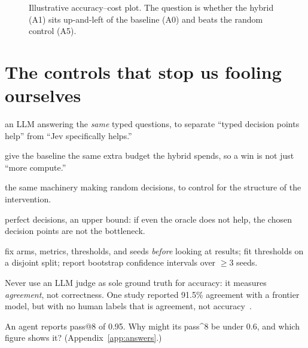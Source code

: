 \begin{figure}[h]\centering
{}
\caption{Illustrative accuracy--cost plot. The question is whether the hybrid (A1) sits
up-and-left of the baseline (A0) and beats the random control (A5).}
\label{fig:pareto}
\end{figure}

\section{The controls that stop us fooling ourselves}

\begin{description}[leftmargin=1.4cm,style=nextline]
  \item[Same-interface baseline (ARM-A2)] an LLM answering the \emph{same} typed questions,
    to separate ``typed decision points help'' from ``Jev specifically helps.''
  \item[Matched compute (ARM-A6)] give the baseline the same extra budget the hybrid spends,
    so a win is not just ``more compute.''
  \item[Random policy (ARM-A5)] the same machinery making random decisions, to control for
    the structure of the intervention.
  \item[Oracle (ARM-A4)] perfect decisions, an upper bound: if even the oracle does not help,
    the chosen decision points are not the bottleneck.
  \item[Pre-registration] fix arms, metrics, thresholds, and seeds \emph{before} looking at
    results; fit thresholds on a disjoint split; report bootstrap confidence intervals over
    $\ge 3$ seeds.
\end{description}

\begin{pitfall}
Never use an LLM judge as sole ground truth for accuracy: it measures \emph{agreement}, not
correctness. One study reported 91.5\% agreement with a frontier model, but with no human
labels that is agreement, not accuracy~\citep{good_start_labs}.
\end{pitfall}

\begin{checkbox}
An agent reports pass@8 of 0.95. Why might its pass\^{}8 be under 0.6, and which figure shows
it? (Appendix~\ref{app:answers}.)
\end{checkbox}
